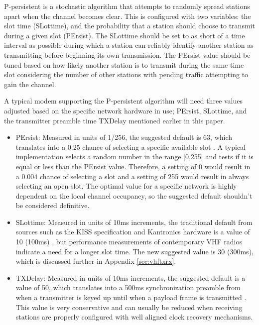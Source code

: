 P-persistent is a stochastic algorithm that attempts to randomly spread
stations apart when the channel becomes clear. 
This is configured with two variables: the slot time (SLottime), and the
probability that a station should choose to transmit during a given slot (PErsist). 
The SLottime
should be set to as short of a time interval as possible during which a station can
reliably identify another station as transmitting 
before beginning its own transmission.
The PErsist value should be tuned based on how likely another station is to transmit 
during the same time slot considering the number of other stations with 
pending traffic attempting to gain the channel.

A typical modem supporting the P-persistent algorithm will need three values adjusted
based on the specific network hardware in use; PErsist, SLottime, and the 
transmitter preamble time TXDelay mentioned earlier in this paper.

\begin{itemize}
	\item PErsist: Measured in units of 1/256, the suggested default is
		63, which translates into a 0.25 chance of selecting a specific available
		slot \cite{KISSspec}. 
		A typical implementation selects a random number in the range
		[0,255] and tests if it is equal or less than the PErsist value.
		Therefore, a setting of 0 would result in a 0.004 chance of selecting 
		a slot and a setting of 255 would result in always selecting an open slot.
		The optimal value for a specific network is highly dependent on the
		local channel occupancy, so the suggested default shouldn't
		be considered definitive.
	\item SLottime: Measured in units of 10ms increments, the traditional
		default from sources such as the KISS specification and 
		Kantronics hardware 
		is a value of 10 (100ms) \cite{KISSspec}\cite{kamplusref}, 
		but performance measurements of contemporary VHF radios 
		indicate a need for a longer slot time. 
		The new suggested value is 30 (300ms), which is discussed further
		in Appendix \ref{sec:vhftxrx}.
	\item TXDelay: Measured in units of 10ms increments, the suggested
		default is a value of 50, which translates into a 500ms synchronization
		preamble from when a transmitter is keyed up until when a payload
		frame is transmitted \cite{KISSspec}.
		This value is very conservative and can usually be reduced when
		receiving stations are properly configured with
		well aligned clock recovery mechanisms.
\end{itemize}

